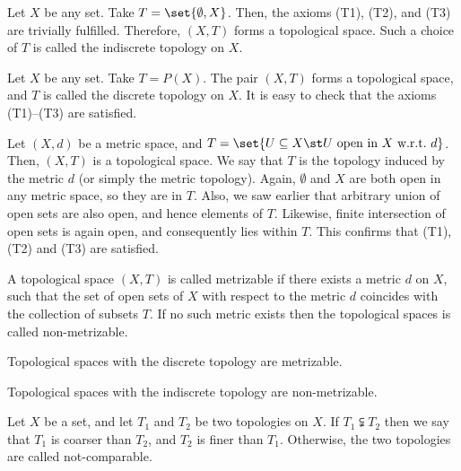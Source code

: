 \begin{negg}
  Let $X$ be any set. Take $T = \set{\emptyset, X}$. Then, the axioms (T1), (T2), and (T3) are trivially fulfilled. Therefore, $(X,T)$ forms a topological space. Such a choice of $T$ is called the indiscrete topology on $X$.
\end{negg}

\begin{negg}
  Let $X$ be any set. Take $T = P(X)$. The pair $(X,T)$ forms a topological space, and $T$ is called the discrete topology on $X$. It is easy to check that the axioms (T1)--(T3) are satisfied.
\end{negg}

\begin{negg}
  Let $(X,d)$ be a metric space, and $T = \set{U \subseteq X \st U\ \text{open in}\ X\ \text{w.r.t.}\ d}$. Then, $(X,T)$ is a topological space. We say that $T$ is the topology induced by the metric $d$ (or simply the metric topology). Again, $\emptyset$ and $X$ are both open in any metric space, so they are in $T$. Also, we saw earlier that arbitrary union of open sets are also open, and hence elements of $T$. Likewise, finite intersection of open sets is again open, and consequently lies within $T$. This confirms that (T1), (T2) and (T3) are satisfied.
\end{negg}

\begin{ndfn}[Metrizable]
  A topological space $(X,T)$ is called metrizable if there exists a metric $d$ on $X$, such that the set of open sets of $X$ with respect to the metric $d$ coincides with the collection of subsets $T$. If no such metric exists then the topological spaces is called non-metrizable.
\end{ndfn}

\begin{nprop}
  Topological spaces with the discrete topology are metrizable.
\end{nprop}

\begin{nprop}
  Topological spaces with the indiscrete topology are non-metrizable.
\end{nprop}

\begin{ndfn}
  Let $X$ be a set, and let $T_1$ and $T_2$ be two topologies on $X$. If $T_1 \subsetneqq T_2$ then we say that $T_1$ is coarser than $T_2$, and $T_2$ is finer than $T_1$. Otherwise, the two topologies are called not-comparable.
\end{ndfn}

